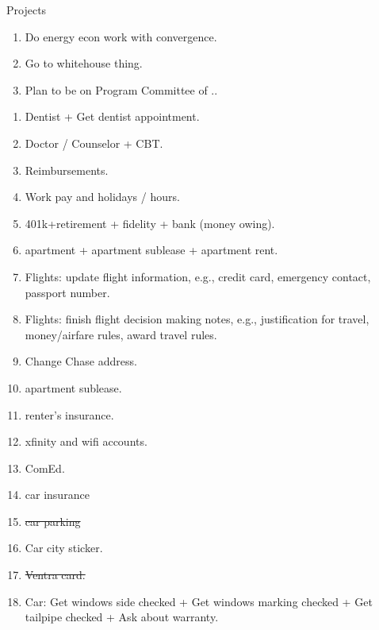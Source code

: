 \documentclass[serif, mathserif, final]{beamer}
\newcommand{\doneTask}[1]{\tiny \item \tiny \sout{#1}}
\begin{document}
\begin{frame}
\begin{columns}
\begin{column}{0.5\textwidth}
\begin{block}{Projects}
\begin{enumerate}
\item \tiny Do energy econ work with convergence. 
\item \tiny Go to whitehouse thing. 
\item \tiny Plan to be on Program Committee of .. 
\end{enumerate}
\begin{enumerate}
\tiny \item \tiny Dentist + Get dentist appointment.
\item \tiny Doctor / Counselor + CBT.
\item \tiny Reimbursements.
\item \tiny Work pay and holidays / hours. 
\item \tiny 401k+retirement  + fidelity + bank (money owing). 
\item \tiny apartment + apartment sublease + apartment rent.
\item \tiny Flights: update flight information, e.g., credit card,
  emergency contact, passport number.
\item \tiny Flights: finish flight decision making notes, e.g.,
  justification for travel, money/airfare rules, award travel rules.
\item \tiny Change Chase address. 
\item \tiny apartment sublease. 
\item \tiny renter's insurance. 
\item \tiny xfinity and wifi accounts. 
\item \tiny ComEd. 
\item \tiny car insurance \doneTask{car parking} 
\item \tiny Car city sticker. \doneTask{Ventra card.}
\item \tiny Car: Get windows side checked + Get windows marking checked + Get tailpipe checked + Ask about warranty. 
\end{enumerate}


\end{block}
\end{column}
\end{columns}
\end{frame}
\end{document}
